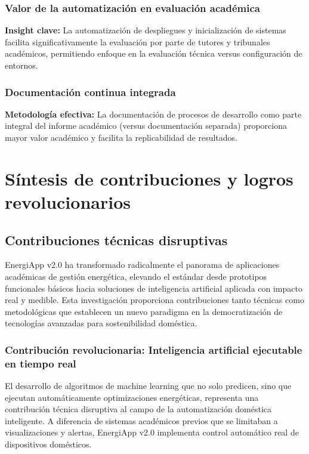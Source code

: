 \subsubsection{Valor de la automatización en evaluación académica}

\textbf{Insight clave:} La automatización de despliegues y inicialización de sistemas facilita significativamente la evaluación por parte de tutores y tribunales académicos, permitiendo enfoque en la evaluación técnica versus configuración de entornos.

\subsubsection{Documentación continua integrada}

\textbf{Metodología efectiva:} La documentación de procesos de desarrollo como parte integral del informe académico (versus documentación separada) proporciona mayor valor académico y facilita la replicabilidad de resultados.

\section{Síntesis de contribuciones y logros revolucionarios}

\subsection{Contribuciones técnicas disruptivas}

EnergiApp v2.0 ha transformado radicalmente el panorama de aplicaciones académicas de gestión energética, elevando el estándar desde prototipos funcionales básicos hacia soluciones de inteligencia artificial aplicada con impacto real y medible. Esta investigación proporciona contribuciones tanto técnicas como metodológicas que establecen un nuevo paradigma en la democratización de tecnologías avanzadas para sostenibilidad doméstica.

\subsubsection{Contribución revolucionaria: Inteligencia artificial ejecutable en tiempo real}

El desarrollo de algoritmos de machine learning que no solo predicen, sino que ejecutan automáticamente optimizaciones energéticas, representa una contribución técnica disruptiva al campo de la automatización doméstica inteligente. A diferencia de sistemas académicos previos que se limitaban a visualizaciones y alertas, EnergiApp v2.0 implementa control automático real de dispositivos domésticos.

